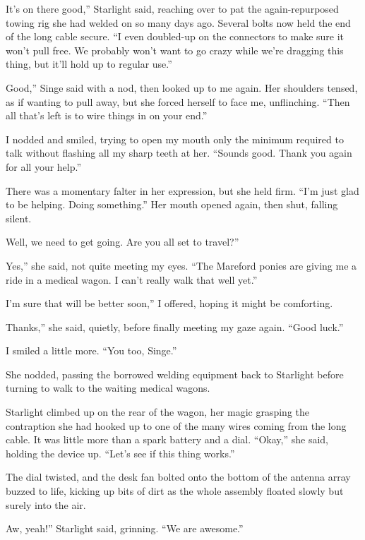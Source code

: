 \leavevmode{}It’s on there good,” Starlight said, reaching over to pat the again-repurposed towing rig she had welded on so many days ago. Several bolts now held the end of the long cable secure. “I even doubled-up on the connectors to make sure it won’t pull free. We probably won’t want to go crazy while we’re dragging this thing, but it’ll hold up to regular use.”

\leavevmode{}Good,” Singe said with a nod, then looked up to me again. Her shoulders tensed, as if wanting to pull away, but she forced herself to face me, unflinching. “Then all that’s left is to wire things in on your end.”

I nodded and smiled, trying to open my mouth only the minimum required to talk without flashing all my sharp teeth at her. “Sounds good. Thank you again for all your help.”

There was a momentary falter in her expression, but she held firm. “I’m just glad to be helping. Doing something.” Her mouth opened again, then shut, falling silent.

\leavevmode{}Well, we need to get going. Are you all set to travel?”

\leavevmode{}Yes,” she said, not quite meeting my eyes. “The Mareford ponies are giving me a ride in a medical wagon. I can’t really walk that well yet.”

\leavevmode{}I’m sure that will be better soon,” I offered, hoping it might be comforting.

\leavevmode{}Thanks,” she said, quietly, before finally meeting my gaze again. “Good luck.”

I smiled a little more. “You too, Singe.”

She nodded, passing the borrowed welding equipment back to Starlight before turning to walk to the waiting medical wagons.

Starlight climbed up on the rear of the wagon, her magic grasping the contraption she had hooked up to one of the many wires coming from the long cable. It was little more than a spark battery and a dial. “Okay,” she said, holding the device up. “Let’s see if this thing works.”

The dial twisted, and the desk fan bolted onto the bottom of the antenna array buzzed to life, kicking up bits of dirt as the whole assembly floated slowly but surely into the air.

\leavevmode{}Aw, yeah!” Starlight said, grinning. “We are awesome.”

